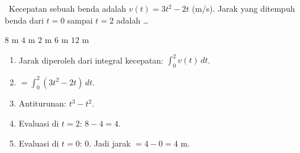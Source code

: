 \documentclass[11pt,a4paper]{exam}
\newenvironment{langkah}{%
  \begin{enumerate}[label=\textbf{Langkah \arabic*:},leftmargin=2.6em,
    itemsep=2pt,topsep=2pt]}{\end{enumerate}}
\newcommand{\Exp}{{\footnotesize\textsf{\textcolor{ungu}{[Expert]}}}\ }
\begin{document}
\begin{questions}
\question \Exp Kecepatan sebuah benda adalah $v(t) = 3t^{2} - 2t$ (m/s). Jarak yang
ditempuh benda dari $t=0$ sampai $t=2$ adalah \dots
\begin{choices}
\choice $8$ m \CorrectChoice $4$ m \choice $2$ m \choice $6$ m \choice $12$ m
\end{choices}
\begin{solution}
\begin{langkah}
\item Jarak diperoleh dari integral kecepatan: $\displaystyle\int_{0}^{2} v(t)\,dt$.
\item $= \displaystyle\int_{0}^{2} (3t^{2} - 2t)\,dt$.
\item Antiturunan: $t^{3} - t^{2}$.
\item Evaluasi di $t=2$: $8 - 4 = 4$.
\item Evaluasi di $t=0$: $0$. Jadi jarak $= 4 - 0 = 4$ m.
\end{langkah}
\end{solution}

\end{questions}

\clearpage
\end{document}

